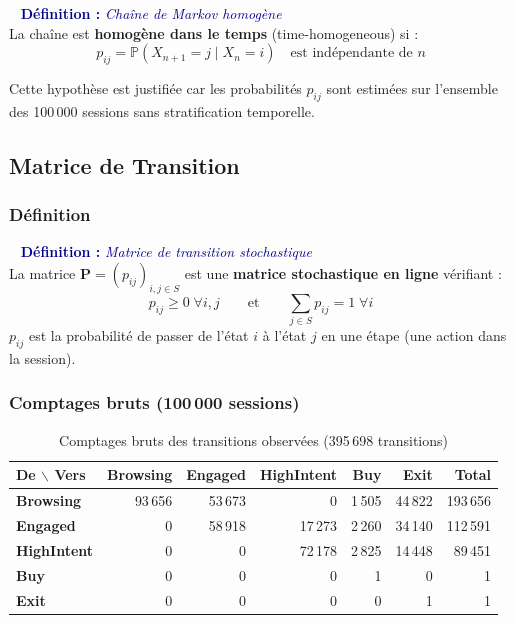 \documentclass[11pt,a4paper]{article}
\newenvironment{defbox}[1]{%
  \vspace{3pt}\begin{framed}
  \noindent{\color{NavyBlue}\rule{0.3cm}{3pt}}~%
  \textcolor{DarkBlue}{\textbf{Définition :} \textit{#1}}\\[3pt]}
  {\end{framed}\vspace{3pt}}
\newcommand{\mat}[1]{\mathbf{#1}}
\newcommand{\Prob}{\mathbb{P}}
\begin{document}
\begin{defbox}{Chaîne de Markov homogène}
La chaîne est \textbf{homogène dans le temps} (time-homogeneous) si :
\[
  p_{ij} = \Prob(X_{n+1}=j \mid X_n=i) \quad \text{est indépendante de } n
\]
\end{defbox}

Cette hypothèse est justifiée car les probabilités $p_{ij}$ sont estimées
sur l'ensemble des 100\,000 sessions sans stratification temporelle.

\subsection{Matrice de Transition}

\subsubsection{Définition}

\begin{defbox}{Matrice de transition stochastique}
La matrice $\mat{P} = (p_{ij})_{i,j\in S}$ est une
\textbf{matrice stochastique en ligne} vérifiant :
\[
  p_{ij} \geq 0 \;\forall i,j
  \qquad \text{et} \qquad
  \sum_{j\in S} p_{ij} = 1 \;\forall i
\]
$p_{ij}$ est la probabilité de passer de l'état $i$ à l'état $j$
en une étape (une action dans la session).
\end{defbox}

\subsubsection{Comptages bruts (100\,000 sessions)}

\begin{table}[H]
\centering
\caption{Comptages bruts des transitions observées (395\,698 transitions)}
\label{tab:comptages}
\begin{tabular}{l|rrrrr|r}
\toprule
\rowcolor{DarkBlue}
\color{white}\textbf{De $\backslash$ Vers} &
\color{white}\textbf{Browsing} &
\color{white}\textbf{Engaged} &
\color{white}\textbf{HighIntent} &
\color{white}\textbf{Buy} &
\color{white}\textbf{Exit} &
\color{white}\textbf{Total} \\
\midrule
\rowcolor{LightBlue}
\textbf{Browsing}   & 93\,656 & 53\,673 &       0 &  1\,505 & 44\,822 & 193\,656 \\
\rowcolor{LightGreen}
\textbf{Engaged}    &       0 & 58\,918 & 17\,273 &  2\,260 & 34\,140 & 112\,591 \\
\rowcolor{LightOrange}
\textbf{HighIntent} &       0 &       0 & 72\,178 &  2\,825 & 14\,448 &  89\,451 \\
\rowcolor{LightBuy}
\textbf{Buy}        &       0 &       0 &       0 &       1 &       0 &        1 \\
\rowcolor{LightRed}
\textbf{Exit}       &       0 &       0 &       0 &       0 &       1 &        1 \\
\bottomrule
\end{tabular}
\end{table}
\end{document}

